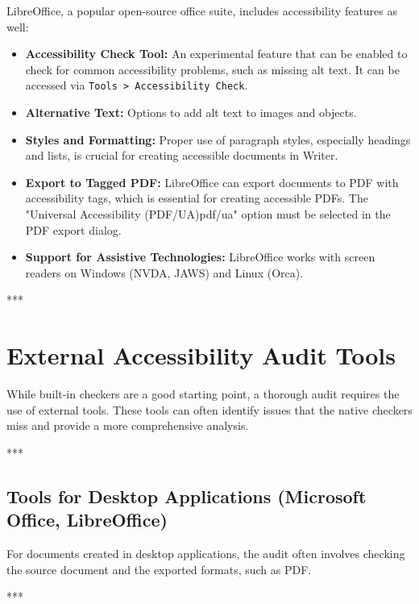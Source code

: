 LibreOffice, a popular open-source office suite, includes accessibility features as well\supercite{LibreOfficeAccessibility}:
\begin{itemize}
	\item \textbf{Accessibility Check Tool:} An experimental feature that can be enabled to check for common accessibility problems, such as missing alt text. It can be accessed via \texttt{Tools > Accessibility Check}.
	\item \textbf{Alternative Text:} Options to add alt text to images and objects.
	\item \textbf{Styles and Formatting:} Proper use of paragraph styles, especially headings and lists, is crucial for creating accessible documents in Writer.
	\item \textbf{Export to Tagged PDF:} LibreOffice can export documents to PDF with accessibility tags, which is essential for creating accessible PDFs. The "Universal Accessibility (PDF/UA)\gls{pdf/ua}" option must be selected in the PDF export dialog.
	\item \textbf{Support for Assistive Technologies:} LibreOffice works with screen readers on Windows (NVDA, JAWS) and Linux (Orca).
\end{itemize}

***

\section{External Accessibility Audit Tools}
\label{sec:external-accessibility-audit-tools}

While built-in checkers are a good starting point, a thorough audit requires the use of external tools. These tools can often identify issues that the native checkers miss and provide a more comprehensive analysis.

***

\subsection{Tools for Desktop Applications (Microsoft Office, LibreOffice)}
\label{sub:tools-for-desktop-applications-microsoft-office-libreoffice}

For documents created in desktop applications, the audit often involves checking the source document and the exported formats, such as PDF.

***

